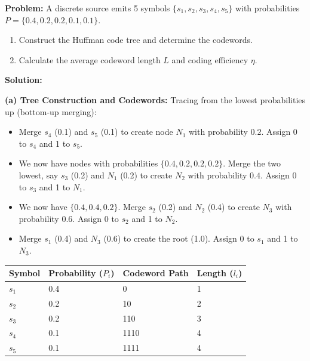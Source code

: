 \documentclass[12pt,a4paper]{article}
\begin{document}
\begin{tcolorbox}[examplebox, title={Worked Example: Huffman Coding}]
\textbf{Problem:} A discrete source emits 5 symbols $\{s_1, s_2, s_3, s_4, s_5\}$ with probabilities $P = \{0.4, 0.2, 0.2, 0.1, 0.1\}$.
\begin{enumerate}[label=\alph*., leftmargin=*, itemsep=1pt, topsep=1pt]
  \item Construct the Huffman code tree and determine the codewords.
  \item Calculate the average codeword length $L$ and coding efficiency $\eta$.
\end{enumerate}
\textbf{Solution:}

\textbf{(a) Tree Construction and Codewords:}
Tracing from the lowest probabilities up (bottom-up merging):
\begin{itemize}[leftmargin=*, itemsep=1pt]
  \item Merge $s_4$ (0.1) and $s_5$ (0.1) to create node $N_1$ with probability $0.2$. Assign 0 to $s_4$ and 1 to $s_5$.
  \item We now have nodes with probabilities $\{0.4, 0.2, 0.2, 0.2\}$. Merge the two lowest, say $s_3$ (0.2) and $N_1$ (0.2) to create $N_2$ with probability $0.4$. Assign 0 to $s_3$ and 1 to $N_1$.
  \item We now have $\{0.4, 0.4, 0.2\}$. Merge $s_2$ (0.2) and $N_2$ (0.4) to create $N_3$ with probability $0.6$. Assign 0 to $s_2$ and 1 to $N_2$.
  \item Merge $s_1$ (0.4) and $N_3$ (0.6) to create the root (1.0). Assign 0 to $s_1$ and 1 to $N_3$.
\end{itemize}

\begin{tabularx}{\linewidth}{|B{1.6cm}|Y|Y|B{1.8cm}|}
\hline
\textbf{Symbol} & \textbf{Probability ($P_i$)} & \textbf{Codeword Path} & \textbf{Length ($l_i$)} \\
\hline
$s_1$ & 0.4 & 0 & 1 \\
$s_2$ & 0.2 & 10 & 2 \\
$s_3$ & 0.2 & 110 & 3 \\
$s_4$ & 0.1 & 1110 & 4 \\
$s_5$ & 0.1 & 1111 & 4 \\
\hline
\end{tabularx}


\end{tcolorbox}
\end{document}
